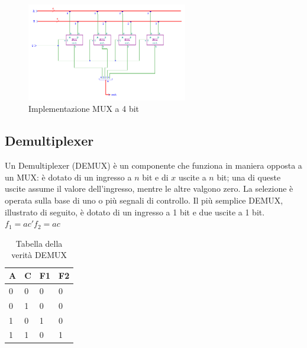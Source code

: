 \documentclass[10pt]{article}
\begin{document}
\begin{itemize}
\begin{figure}[H]
    \begin{minipage}[b]{\textwidth}
        \centering
        \includegraphics[width=70mm]{mux4}
        \caption{Implementazione MUX a 4 bit}
        \label{ }
    \end{minipage}
\end{figure}

\subsection{Demultiplexer}
Un Demultiplexer (DEMUX) è un componente che funziona in maniera opposta a un MUX: è dotato di un ingresso a $n$ bit e di $x$ uscite a $n$ bit; una di queste uscite assume il valore dell'ingresso,
mentre le altre valgono zero. La selezione è operata sulla base di uno o più segnali di controllo.
Il più semplice DEMUX, illustrato di seguito, è dotato di un ingresso a 1 bit e due uscite a 1 bit.
\\
$f_1 = ac'
f_2 = ac$
\\
\begin{table}[H]
    \begin{minipage}[b]{0.4\textwidth}
    \centering
        \begin{tabular}{|ll|ll|}
        \hline
        \textbf{A} & \textbf{C} & \textbf{F1} & \textbf{F2} \\ \hline
        0          & 0          & 0           & 0           \\ 
        0          & 1          & 0           & 0           \\ 
        1          & 0          & 1           & 0          \\ 
        1          & 1          & 0           & 1           \\ \hline
        \end{tabular}
        \caption{Tabella della verità DEMUX}
        \label{tab:my-table}
    \end{minipage}
    \end{table}
    

\end{itemize}
\end{document}
